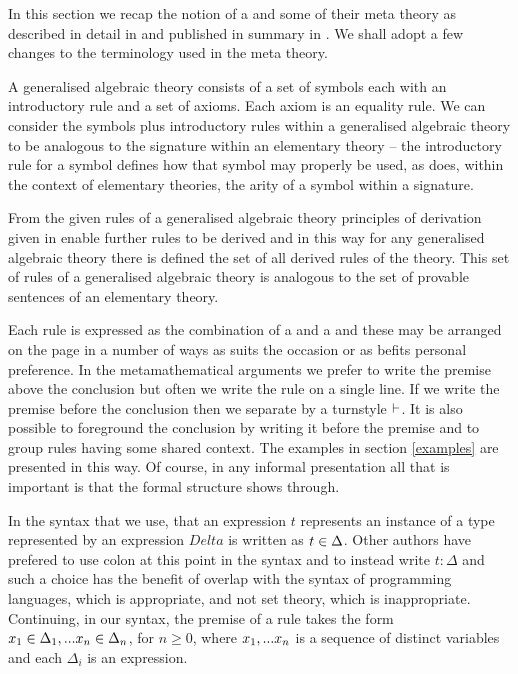 \label{generalisedalgrbraictheories}

\note
In this section we recap the notion of a  and some of their meta theory 
as described in detail in \cite{Cartmell78}  and published in summary in \cite{Cartmell86}.
We shall adopt a few changes to the  terminology used in the meta theory.

\note
A generalised algebraic theory consists of a set of symbols each with an introductory rule and a set of axioms. 
Each axiom is an equality rule. We can consider the symbols plus introductory rules within a generalised algebraic theory to be analogous to the signature within an elementary theory --
the introductory rule for a symbol defines how that symbol may properly be used, as does, within the context of elementary theories, the arity of a symbol within a signature.

\note
From the given rules of a generalised algebraic theory  principles of derivation given in \cite{Cartmell86} enable further rules
to be derived and in this way for any generalised algebraic theory there is defined the set of all derived rules of the theory. 
This set of rules of a generalised algebraic theory is analogous to the set of provable sentences of an elementary theory.
  
Each rule is expressed as the combination of a   and a  and these may be arranged on the page in a number of ways as suits
the occasion or as befits personal preference. In the metamathematical arguments we prefer to write the premise above the conclusion 
 but often we write the rule on a single line. If we write the premise before the conclusion then we separate by a turnstyle $\vdash$. It is also possible to foreground the conclusion by writing it before the premise and to group rules having some shared context. The 
examples in section \ref{examples} are presented in this way.
Of course, in any informal presentation all that is important is that the formal structure shows through.  

In the syntax that we use,  that an expression $t$ represents an instance of a type represented by an expression $Delta$ is written as $t \in \Delta$. Other authors have prefered to use colon at this point in the syntax  and to instead write $t:\Delta$ and such a choice has the benefit of overlap with the syntax
of programming languages, which is appropriate, and not set theory, which is inappropriate. Continuing, in our syntax,
the premise of a rule  takes the form $x_1 \in \Delta_1,... x_{n} \in \Delta_{n}$, for $n \geq 0$, where $x_1,...x_n$ is a sequence of distinct variables and each $\Delta_i$ is an expression.

